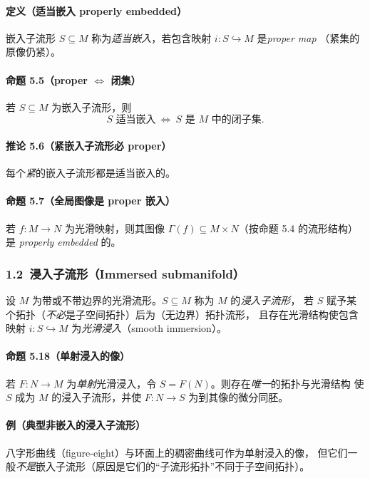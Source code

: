 \documentclass[11pt,a4paper]{article}
\begin{document}
\paragraph{定义（适当嵌入 properly embedded）}
嵌入子流形 $S\subseteq M$ 称为\emph{适当嵌入}，若包含映射 $i:S\hookrightarrow M$ 是\emph{proper map}
（紧集的原像仍紧）。

\paragraph{命题 5.5（proper $\Leftrightarrow$ 闭集）}
若 $S\subseteq M$ 为嵌入子流形，则
\[
S \text{ 适当嵌入}\ \Longleftrightarrow\ S \text{ 是 } M \text{ 中的闭子集}.
\]

\paragraph{推论 5.6（紧嵌入子流形必 proper）}
每个\emph{紧}的嵌入子流形都是适当嵌入的。

\paragraph{命题 5.7（全局图像是 proper 嵌入）}
若 $f:M\to N$ 为光滑映射，则其图像 $\Gamma(f)\subseteq M\times N$（按命题 5.4 的流形结构）
是 \emph{properly embedded} 的。

\subsubsection*{1.2\ 浸入子流形（Immersed submanifold）}
设 $M$ 为带或不带边界的光滑流形。$S\subseteq M$ 称为 $M$ 的\emph{浸入子流形}，
若 $S$ 赋予某个拓扑（\emph{不必}是子空间拓扑）后为（无边界）拓扑流形，
且存在光滑结构使包含映射 $i:S\hookrightarrow M$ 为\emph{光滑浸入}（smooth immersion）。

\paragraph{命题 5.18（单射浸入的像）}
若 $F:N\to M$ 为\emph{单射}光滑浸入，令 $S=F(N)$。则存在\emph{唯一}的拓扑与光滑结构
使 $S$ 成为 $M$ 的浸入子流形，并使 $F:N\to S$ 为到其像的微分同胚。

\paragraph{例（典型非嵌入的浸入子流形）}
八字形曲线（figure-eight）与环面上的稠密曲线可作为单射浸入的像，
但它们一般\emph{不是}嵌入子流形（原因是它们的“子流形拓扑”不同于子空间拓扑）。
\end{document}
